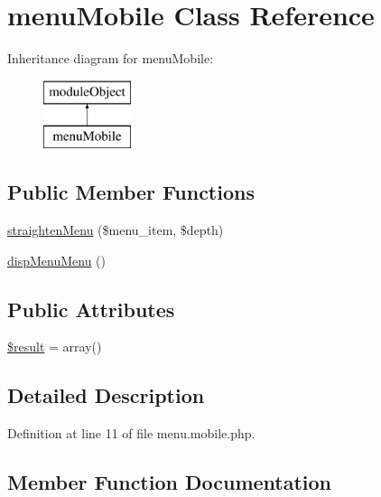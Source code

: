 \hypertarget{classmenuMobile}{}\section{menu\+Mobile Class Reference}
\label{classmenuMobile}
Inheritance diagram for menu\+Mobile\+:\begin{figure}[H]
\begin{center}
\leavevmode
\includegraphics[height=2.000000cm]{classmenuMobile}
\end{center}
\end{figure}
\subsection*{Public Member Functions}
\begin{DoxyCompactItemize}
\item 
\hyperlink{classmenuMobile_aba6cbdcf9a47990ae13d8ae647fd0d2f}{straighten\+Menu} (\$menu\+\_\+item, \$depth)
\item 
\hyperlink{classmenuMobile_a75e49bf960ee60abeb24923cc0f63087}{disp\+Menu\+Menu} ()
\end{DoxyCompactItemize}
\subsection*{Public Attributes}
\begin{DoxyCompactItemize}
\item 
\hyperlink{classmenuMobile_a35fcf2f0b0eb7fc94fa7f0abc36828cd}{\$result} = array()
\end{DoxyCompactItemize}


\subsection{Detailed Description}


Definition at line 11 of file menu.\+mobile.\+php.



\subsection{Member Function Documentation}
\hypertarget{classmenuMobile_a75e49bf960ee60abeb24923cc0f63087}{}\label{classmenuMobile_a75e49bf960ee60abeb24923cc0f63087} 
